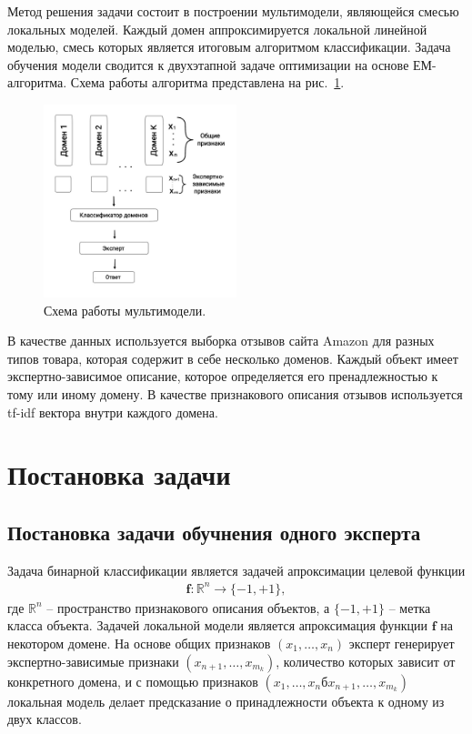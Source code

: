 \documentclass[12pt, twoside]{article}
\begin{document}
Метод решения задачи состоит в построении мультимодели, являющейся смесью локальных моделей. Каждый домен аппроксимируется локальной линейной моделью, смесь которых является итоговым алгоритмом классификации. Задача обучения модели сводится к двухэтапной задаче оптимизации на основе ЕМ-алгоритма. Схема работы алгоритма представлена на рис.~\ref{example:1}.

\begin{figure}[H]\center
\includegraphics[width=0.5\textwidth]{Schem_1.jpg}
\caption{Схема работы мультимодели.}
\label{example:1}
\end{figure}

В качестве данных используется выборка отзывов сайта Amazon для разных типов товара, которая содержит в себе несколько доменов. Каждый объект имеет экспертно-зависимое описание, которое определяется его пренадлежностью к тому или иному домену. В качестве признакового описания отзывов используется tf-idf вектора внутри каждого домена. 


\section{Постановка задачи}
\subsection{Постановка задачи обучнения одного эксперта}
Задача бинарной классификации является задачей апроксимации целевой функции
\[
\label{eq:st:1.1}
\begin{aligned}
\mathbf{f}: \mathbb{R}^n \to \{-1, +1\},
\end{aligned}
\]
где $\mathbb{R}^n$ -- пространство признакового описания объектов, а $\{-1, +1\}$ -- метка класса объекта. Задачей локальной модели является апроксимация функции $\mathbf{f}$ на некотором домене. На основе общих признаков $(x_1, \ldots, x_n)$ эксперт генерирует экспертно-зависимые признаки $(x_{n+1}, \ldots, x_{m_k})$, количество которых зависит от конкретного домена, и с помощью признаков $(x_1, \ldots, x_nб x_{n+1}, \ldots, x_{m_k})$ локальная модель делает предсказание о принадлежности объекта к одному из двух классов.
\end{document}
